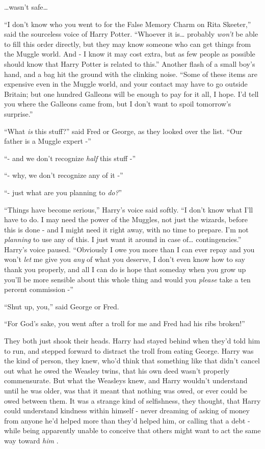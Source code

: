 \ldots{}wasn't safe\ldots{}

``I don't know who you went to for the False Memory Charm on Rita
Skeeter,'' said the sourceless voice of Harry Potter. ``Whoever it
is\ldots{} probably \emph{won't} be able to fill this order directly,
but they may know someone who can get things from the Muggle world. And
- I know it may cost extra, but as few people as possible should know
that Harry Potter is related to this.'' Another flash of a small boy's
hand, and a bag hit the ground with the clinking noise. ``Some of these
items are expensive even in the Muggle world, and your contact may have
to go outside Britain; but one hundred Galleons will be enough to pay
for it all, I hope. I'd tell you where the Galleons came from, but I
don't want to spoil tomorrow's surprise.''

``What \emph{is} this stuff?'' said Fred or George, as they looked over
the list. ``Our father is a Muggle expert -''

``- and we don't recognize \emph{half} this stuff -''

``- why, we don't recognize any of it -''

``- just what are you planning to \emph{do?}''

``Things have become serious,'' Harry's voice said softly. ``I don't
know what I'll have to do. I may need the power of the Muggles, not just
the wizards, before this is done - and I might need it right away, with
no time to prepare. I'm not \emph{planning} to use any of this. I just
want it around in case of\ldots{} contingencies.'' Harry's voice paused.
``Obviously I owe you more than I can ever repay and you won't
\emph{let} me give you \emph{any} of what you deserve, I don't even know
how to say thank you properly, and all I can do is hope that someday
when you grow up you'll be more sensible about this whole thing and
would you \emph{please} take a ten percent commission -''

``Shut up, you,'' said George or Fred.

``For God's sake, you went after a troll for me and Fred had his ribs
broken!''

They both just shook their heads. Harry had stayed behind when they'd
told him to run, and stepped forward to distract the troll from eating
George. Harry was the kind of person, they knew, who'd think that
something like that didn't cancel out what he owed the Weasley twins,
that his own deed wasn't properly commensurate. But what the Weasleys
knew, and Harry wouldn't understand until he was older, was that it
meant that nothing was owed, or ever could be owed between them. It was
a strange kind of selfishness, they thought, that Harry could understand
kindness within himself - never dreaming of asking of money from anyone
he'd helped more than they'd helped him, or calling that a debt - while
being apparently unable to conceive that others might want to act the
same way toward \emph{him} .

